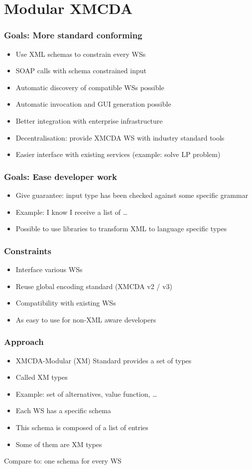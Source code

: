 \documentclass[french,english]{beamer}
\begin{document}
\section{Modular XMCDA}
\begin{frame}
	\frametitle{Goals: More standard conforming}
	\begin{itemize}
		\item Use XML schemas to constrain every \acp{WS}
		\item SOAP calls with schema constrained input
		\item Automatic discovery of compatible \acp{WS} possible
		\item Automatic invocation and GUI generation possible
		\item Better integration with enterprise infrastructure
		\item Decentralisation: provide XMCDA \ac{WS} with industry standard tools
		\item Easier interface with existing services (example: solve LP problem)
	\end{itemize}
\end{frame}

\begin{frame}
	\frametitle{Goals: Ease developer work}
	\begin{itemize}
		\item Give guarantee: input type has been checked against some specific grammar
		\item Example: I know I receive a list of …
		\item Possible to use libraries to transform XML to language specific types
	\end{itemize}
\end{frame}

\begin{frame}
	\frametitle{Constraints}
	\begin{itemize}
		\item Interface various \acp{WS}
		\item Reuse global encoding standard (XMCDA v2 / v3)
		\item Compatibility with existing \acp{WS}
		\item As easy to use for non-XML aware developers
	\end{itemize}
\end{frame}

\begin{frame}
	\frametitle{Approach}
	\begin{itemize}
		\item XMCDA-Modular (XM) Standard provides a set of types
		\item Called XM types
		\item Example: set of alternatives, value function, …
		\item Each \ac{WS} has a specific schema
		\item This schema is composed of a list of entries
		\item Some of them are XM types
	\end{itemize}
	Compare to: one schema for every \ac{WS}
\end{frame}
\end{document}

